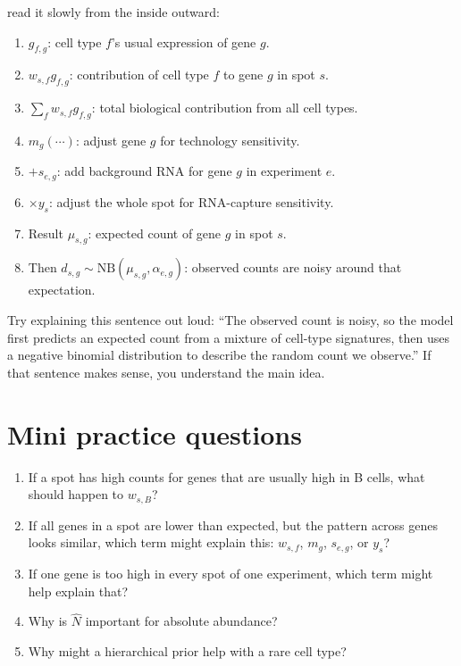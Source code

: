 \documentclass[11pt]{article}
\newcommand{\NB}{\mathrm{NB}}
\begin{document}
read it slowly from the inside outward:

\begin{enumerate}
  \item $g_{f,g}$: cell type $f$'s usual expression of gene $g$.
  \item $w_{s,f}g_{f,g}$: contribution of cell type $f$ to gene $g$ in spot $s$.
  \item $\sum_f w_{s,f}g_{f,g}$: total biological contribution from all cell types.
  \item $m_g(\cdots)$: adjust gene $g$ for technology sensitivity.
  \item $+s_{e,g}$: add background RNA for gene $g$ in experiment $e$.
  \item $\times y_s$: adjust the whole spot for RNA-capture sensitivity.
  \item Result $\mu_{s,g}$: expected count of gene $g$ in spot $s$.
  \item Then $d_{s,g}\sim \NB(\mu_{s,g},\alpha_{e,g})$: observed counts are noisy around that expectation.
\end{enumerate}

\begin{checkpoint}
Try explaining this sentence out loud: ``The observed count is noisy, so the model first predicts an expected count from a mixture of cell-type signatures, then uses a negative binomial distribution to describe the random count we observe.'' If that sentence makes sense, you understand the main idea.
\end{checkpoint}

\section{Mini practice questions}

\begin{enumerate}
  \item If a spot has high counts for genes that are usually high in B cells, what should happen to $w_{s,B}$?
  \item If all genes in a spot are lower than expected, but the pattern across genes looks similar, which term might explain this: $w_{s,f}$, $m_g$, $s_{e,g}$, or $y_s$?
  \item If one gene is too high in every spot of one experiment, which term might help explain that?
  \item Why is $\hat N$ important for absolute abundance?
  \item Why might a hierarchical prior help with a rare cell type?
\end{enumerate}
\end{document}
